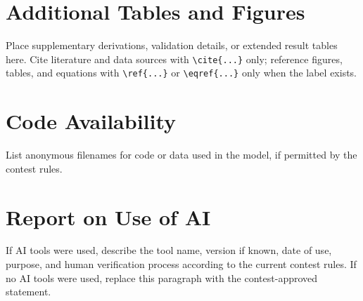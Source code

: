 \documentclass{mcmthesis}
\begin{document}
\appendix
\section{Additional Tables and Figures}
Place supplementary derivations, validation details, or extended result tables here. Cite literature and data sources with \verb|\cite{...}| only; reference figures, tables, and equations with \verb|\ref{...}| or \verb|\eqref{...}| only when the label exists.

\section{Code Availability}
List anonymous filenames for code or data used in the model, if permitted by the contest rules.

\section*{Report on Use of AI}
If AI tools were used, describe the tool name, version if known, date of use, purpose, and human verification process according to the current contest rules. If no AI tools were used, replace this paragraph with the contest-approved statement.
\end{document}
